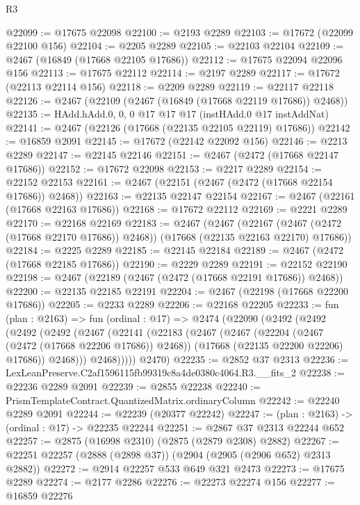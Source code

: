 \begin{lexlean}{R3}
\begin{coremodule}
@22099 := @17675 @22098
@22100 := @2193 @2289
@22103 := @17672 (@22099 @22100 @156)
@22104 := @2205 @2289
@22105 := @22103 @22104
@22109 := @2467 (@16849 (@17668 @22105 @17686))
@22112 := @17675 @22094 @22096 @156
@22113 := @17675 @22112
@22114 := @2197 @2289
@22117 := @17672 (@22113 @22114 @156)
@22118 := @2209 @2289
@22119 := @22117 @22118
@22126 := @2467 (@22109 (@2467 (@16849 (@17668 @22119 @17686)) @2468))
@22135 := HAdd.hAdd.{0, 0, 0} @17 @17 @17 (instHAdd.{0} @17 instAddNat)
@22141 := @2467 (@22126 (@17668 (@22135 @22105 @22119) @17686))
@22142 := @16859 @2091
@22145 := @17672 (@22142 @22092 @156)
@22146 := @2213 @2289
@22147 := @22145 @22146
@22151 := @2467 (@2472 (@17668 @22147 @17686))
@22152 := @17672 @22098
@22153 := @2217 @2289
@22154 := @22152 @22153
@22161 := @2467 (@22151 (@2467 (@2472 (@17668 @22154 @17686)) @2468))
@22163 := @22135 @22147 @22154
@22167 := @2467 (@22161 (@17668 @22163 @17686))
@22168 := @17672 @22112
@22169 := @2221 @2289
@22170 := @22168 @22169
@22183 := @2467
    (@2467
      (@22167 (@2467 (@2472 (@17668 @22170 @17686)) @2468))
      (@17668 (@22135 @22163 @22170) @17686))
@22184 := @2225 @2289
@22185 := @22145 @22184
@22189 := @2467 (@2472 (@17668 @22185 @17686))
@22190 := @2229 @2289
@22191 := @22152 @22190
@22198 := @2467 (@22189 (@2467 (@2472 (@17668 @22191 @17686)) @2468))
@22200 := @22135 @22185 @22191
@22204 := @2467 (@22198 (@17668 @22200 @17686))
@22205 := @2233 @2289
@22206 := @22168 @22205
@22233 := fun (plan : @2163) =>
  fun (ordinal : @17) =>
  @2474
    (@22090
      (@2492
        (@2492
          (@2492
            (@2492
              (@2467
                (@22141
                  (@22183
                    (@2467
                      (@2467
                        (@22204 (@2467 (@2472 (@17668 @22206 @17686)) @2468))
                        (@17668 (@22135 @22200 @22206) @17686))
                      @2468)))
                @2468)))))
      @2470)
@22235 := @2852 @37 @2313
@22236 := LexLeanPreserve.C2af1596115fb99319c8a4de0380c4064.R3.__fits_2
@22238 := @22236 @2289 @2091
@22239 := @2855 @22238
@22240 := PrismTemplateContract.QuantizedMatrix.ordinaryColumn
@22242 := @22240 @2289 @2091
@22244 := @22239 (@20377 @22242)
@22247 := (plan : @2163) -> (ordinal : @17) -> @22235 @22244
@22251 := @2867 @37 @2313 @22244 @652
@22257 := @2875 (@16998 @2310) (@2875 (@2879 @2308) @2882)
@22267 := @22251 @22257 (@2888 (@2898 @37)) (@2904 (@2905 (@2906 @652) @2313 @2882))
@22272 := @2914 @22257 @533 @649 @321 @2473
@22273 := @17675 @2289
@22274 := @2177 @2286
@22276 := @22273 @22274 @156
@22277 := @16859 @22276

\end{coremodule}
\end{lexlean}
